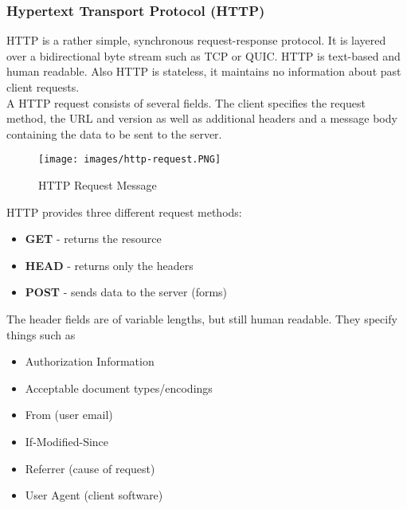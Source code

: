 \subsubsection{Hypertext Transport Protocol (HTTP)}
HTTP is a rather simple, synchronous request-response protocol. It is layered over a bidirectional byte stream such as TCP or QUIC. HTTP is text-based and human readable. Also HTTP is stateless, it maintains no information about past client requests.\vspace{.3cm}\\
A HTTP request consists of several fields. The client specifies the request method, the URL and version as well as additional headers and a message body containing the data to be sent to the server.
\begin{figure}[H]
\centering
\texttt{[image: images/http-request.PNG]}
\label{http_request}
\caption{HTTP Request Message}
\end{figure}
HTTP provides three different request methods:
\begin{itemize}
\item \textbf{GET} - returns the resource
\item \textbf{HEAD} - returns only the headers
\item \textbf{POST} - sends data to the server (forms)
\end{itemize}
The header fields are of variable lengths, but still human readable. They specify things such as
\begin{itemize}
\item Authorization Information
\item Acceptable document types/encodings
\item From (user email)
\item If-Modified-Since
\item Referrer (cause of request)
\item User Agent (client software)
\end{itemize}


